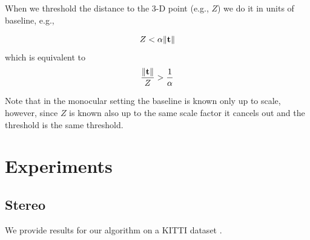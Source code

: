 \documentclass[runningheads]{llncs}
\DeclarePairedDelimiter{\norm}{\lVert}{\rVert}
\begin{document}
When we threshold the distance to the 3-D point (e.g., $Z$) we do it
in units of baseline, e.g.,

\begin{equation}
Z<\alpha \norm{ \mathbf{t} }
\end{equation}
which is equivalent to
\begin{equation}
\frac{\norm{\mathbf{t}}}{Z} > \frac{1}{\alpha}
\end{equation}

Note that in the monocular setting the baseline is known only up to scale, however, since $Z$ is known also up to the same scale factor it cancels out and the threshold is the same threshold.

\section{Experiments}

\subsection{Stereo}
We provide results for our algorithm on a KITTI dataset
\cite{Geiger2012}.
\end{document}
